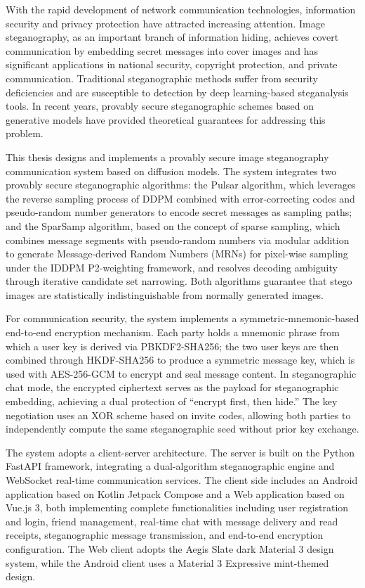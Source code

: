 \newcommand{\keywordsEn}[1][Image Steganography; Provable Security; Diffusion Model; End-to-End Encryption; Cross-platform Communication; Steganography System]{#1}
\begin{abstractEn}
    With the rapid development of network communication technologies, information security and privacy protection have attracted increasing attention. Image steganography, as an important branch of information hiding, achieves covert communication by embedding secret messages into cover images and has significant applications in national security, copyright protection, and private communication. Traditional steganographic methods suffer from security deficiencies and are susceptible to detection by deep learning-based steganalysis tools. In recent years, provably secure steganographic schemes based on generative models have provided theoretical guarantees for addressing this problem.

    This thesis designs and implements a provably secure image steganography communication system based on diffusion models. The system integrates two provably secure steganographic algorithms: the Pulsar algorithm, which leverages the reverse sampling process of DDPM combined with error-correcting codes and pseudo-random number generators to encode secret messages as sampling paths; and the SparSamp algorithm, based on the concept of sparse sampling, which combines message segments with pseudo-random numbers via modular addition to generate Message-derived Random Numbers (MRNs) for pixel-wise sampling under the IDDPM P2-weighting framework, and resolves decoding ambiguity through iterative candidate set narrowing. Both algorithms guarantee that stego images are statistically indistinguishable from normally generated images.

    For communication security, the system implements a symmetric-mnemonic-based end-to-end encryption mechanism. Each party holds a mnemonic phrase from which a user key is derived via PBKDF2-SHA256; the two user keys are then combined through HKDF-SHA256 to produce a symmetric message key, which is used with AES-256-GCM to encrypt and seal message content. In steganographic chat mode, the encrypted ciphertext serves as the payload for steganographic embedding, achieving a dual protection of ``encrypt first, then hide.'' The key negotiation uses an XOR scheme based on invite codes, allowing both parties to independently compute the same steganographic seed without prior key exchange.

    The system adopts a client-server architecture. The server is built on the Python FastAPI framework, integrating a dual-algorithm steganographic engine and WebSocket real-time communication services. The client side includes an Android application based on Kotlin Jetpack Compose and a Web application based on Vue.js 3, both implementing complete functionalities including user registration and login, friend management, real-time chat with message delivery and read receipts, steganographic message transmission, and end-to-end encryption configuration. The Web client adopts the Aegis Slate dark Material 3 design system, while the Android client uses a Material 3 Expressive mint-themed design.


\end{abstractEn}
